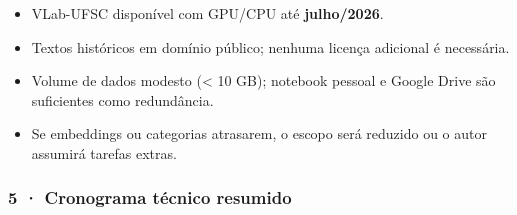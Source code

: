 \begin{itemize}
\tightlist
\item
  VLab-UFSC disponível com GPU/CPU até \textbf{julho/2026}.\\
\item
  Textos históricos em domínio público; nenhuma licença adicional é
  necessária.\\
\item
  Volume de dados modesto (\textless{} 10 GB); notebook pessoal e Google
  Drive são suficientes como redundância.\\
\item
  Se embeddings ou categorias atrasarem, o escopo será reduzido ou o
  autor assumirá tarefas extras.
\end{itemize}

\subsubsection{5 · Cronograma técnico
resumido}\label{cronograma-tuxe9cnico-resumido}

